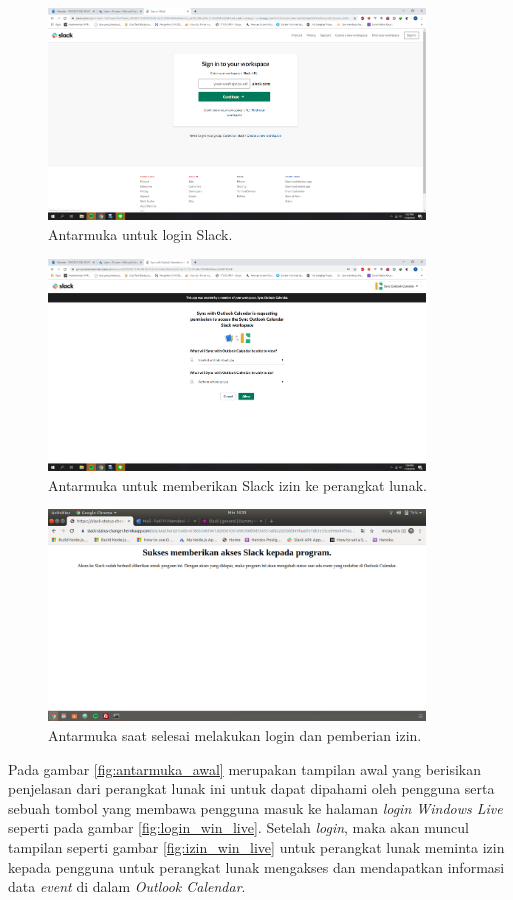 \begin{figure}[h]
  \includegraphics[width=10cm]{./Gambar/Step5.png}
  \centering
  \caption{Antarmuka untuk login Slack.}
  \label{fig:login_slack}
\end{figure}

\begin{figure}[h]
  \includegraphics[width=10cm]{./Gambar/Step6.png}
  \centering
  \caption{Antarmuka untuk memberikan Slack izin ke perangkat lunak.}
  \label{fig:izin_slack}
\end{figure}

\begin{figure}[h]
  \includegraphics[width=10cm]{./Gambar/Step7.png}
  \centering
  \caption{Antarmuka saat selesai melakukan login dan pemberian izin.}
  \label{fig:setelah_selesai}
\end{figure}
\clearpage

Pada gambar \ref{fig:antarmuka_awal} merupakan tampilan awal yang berisikan penjelasan dari perangkat lunak ini untuk dapat dipahami oleh pengguna serta sebuah tombol yang membawa pengguna masuk ke halaman \textit{login Windows Live} seperti pada gambar \ref{fig:login_win_live}. Setelah \textit{login}, maka akan muncul tampilan seperti gambar \ref{fig:izin_win_live} untuk perangkat lunak meminta izin kepada pengguna untuk perangkat lunak mengakses dan mendapatkan informasi data \textit{event} di dalam \textit{Outlook Calendar}. 

